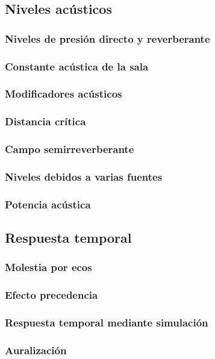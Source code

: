 \documentclass[a4paper, 8pt]{extarticle}
\begin{document}
\begin{multicols}{3}
  \subsection{Niveles acústicos}
  \subsubsection{Niveles de presión directo y reverberante}
  \subsubsection{Constante acústica de la sala}
  \subsubsection{Modificadores acústicos}
  \subsubsection{Distancia crítica}
  \subsubsection{Campo semirreverberante}
  \subsubsection{Niveles debidos a varias fuentes}
  \subsubsection{Potencia acústica}

  \subsection{Respuesta temporal}
  \subsubsection{Molestia por ecos}
  \subsubsection{Efecto precedencia}
  \subsubsection{Respuesta temporal mediante simulación}
  \subsubsection{Auralización}


\end{multicols}
\end{document}
